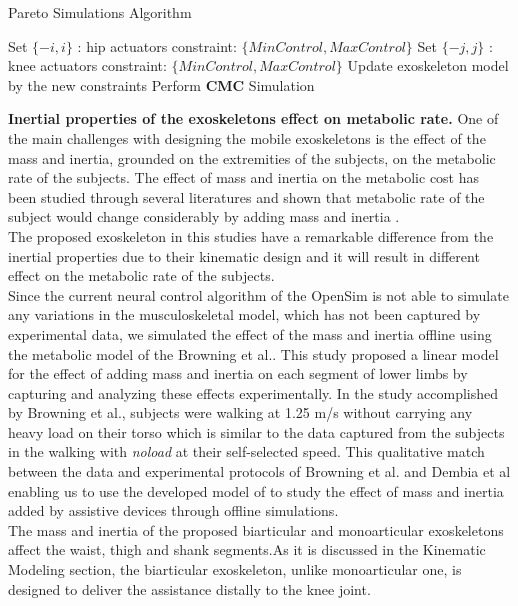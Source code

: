 \documentclass[10pt,letterpaper]{article}
\begin{document}
\begin{algorithm}\label{Algorithm_Pareto_simulation}
	\caption{Pareto Simulations Algorithm}\label{Pareto_Algorithm}
	\begin{algorithmic}[1]
		\State Set $\{-i,i\}$ : hip actuators constraint: $\{Min Control, Max Control\}$
		\State Set $\{-j,j\}$ : knee actuators constraint: $\{Min Control, Max Control\}$
		\State Update exoskeleton model by the new constraints
		\State Perform \textbf{CMC} Simulation
		\EndFor
		\EndFor
	\end{algorithmic}
\end{algorithm}
\textbf{Inertial properties of the exoskeletons effect on metabolic rate.} One of the main challenges with designing the mobile exoskeletons is the effect of the mass and inertia, grounded on the extremities of the subjects, on the metabolic rate of the subjects. The effect of mass and inertia on the metabolic cost has been studied through several literatures \cite{133,134} and shown that metabolic rate of the subject would change considerably by adding mass and inertia \cite{133,134,135}.\\
The proposed exoskeleton in this studies have a remarkable difference from the inertial properties due to their kinematic design and it will result in different effect on the metabolic rate of the subjects.\\
Since the current neural control algorithm of the OpenSim is not able to simulate any variations in the musculoskeletal model, which has not been captured by experimental data, we simulated the effect of the mass and inertia offline using the metabolic model of the Browning et al.\cite{133}. This study proposed a linear model for the effect of adding mass and inertia on each segment of lower limbs by capturing and analyzing these effects experimentally. In the study accomplished by Browning et al.\cite{133}, subjects were walking at 1.25 m/s without carrying any heavy load on their torso which is similar to the data captured from the subjects in the walking with \textit{\textit{noload}} at their self-selected speed\cite{93}. This qualitative match between the data and experimental protocols of Browning et al. and Dembia et al enabling us to use the developed model of \cite{133}  to study the effect of mass and inertia added by assistive devices through offline simulations.\\
The mass and inertia of the proposed biarticular and monoarticular exoskeletons affect the waist, thigh and shank segments.As it is discussed in the Kinematic Modeling section, the biarticular exoskeleton, unlike monoarticular one, is designed to deliver the assistance distally to the knee joint.
\end{document}
